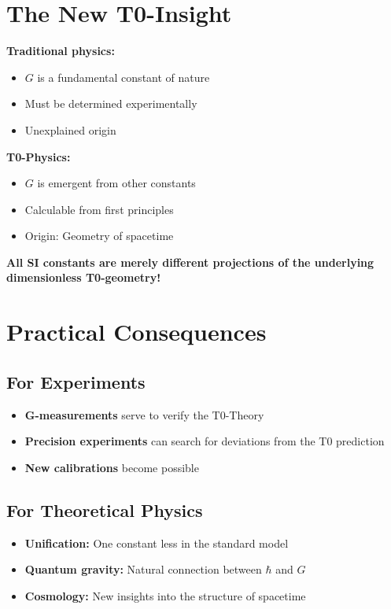 \documentclass[12pt,a4paper]{article}
\theoremstyle{definition}
\begin{document}
	\section{The New T0-Insight}
	
	\begin{revolution}
		\textbf{Traditional physics:}
		\begin{itemize}
			\item $G$ is a fundamental constant of nature
			\item Must be determined experimentally
			\item Unexplained origin
		\end{itemize}
		
		\textbf{T0-Physics:}
		\begin{itemize}
			\item $G$ is emergent from other constants
			\item Calculable from first principles
			\item Origin: Geometry of spacetime
		\end{itemize}
		
		\textbf{All SI constants are merely different projections of the underlying dimensionless T0-geometry!}
	\end{revolution}
	
	\section{Practical Consequences}
	
	\subsection{For Experiments}
	
	\begin{itemize}
		\item \textbf{G-measurements} serve to verify the T0-Theory
		\item \textbf{Precision experiments} can search for deviations from the T0 prediction
		\item \textbf{New calibrations} become possible
	\end{itemize}
	
	\subsection{For Theoretical Physics}
	
	\begin{itemize}
		\item \textbf{Unification:} One constant less in the standard model
		\item \textbf{Quantum gravity:} Natural connection between $\hbar$ and $G$
		\item \textbf{Cosmology:} New insights into the structure of spacetime
	\end{itemize}
	
\end{document}
